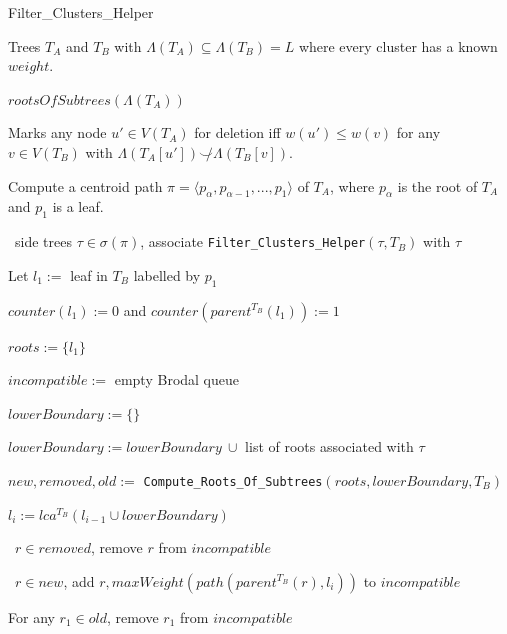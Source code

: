 \documentclass{article}
\newcommand{\compatible}{\smile}
\newcommand{\leafset}{\Lambda}
\begin{document}
    \begin{algorithm}
        \caption{Filter\_Clusters\_Helper}
        \label{alg:filterclustershelper}

        \begin{algorithmic}[1]
            \Input Trees $T_A$ and $T_B$ with $\leafset(T_A) \subseteq \leafset(T_B) = L$ where every cluster has a known $weight$.

            \Output $rootsOfSubtrees(\leafset(T_A))$

            \SideEffect Marks any node $u' \in V(T_A)$ for deletion iff $w(u') \leq w(v)$ for any $v \in V(T_B)$ with $\leafset(T_A[u']) \not\compatible \leafset(T_B[v])$.

            \State Compute a centroid path $\pi = \langle p_{\alpha}, p_{\alpha - 1}, ..., p_1 \rangle$ of $T_A$, where $p_{\alpha}$ is the root of $T_A$ and $p_1$ is a leaf.

            \State \algorithmicforall\ side trees $\tau \in \sigma(\pi)$,
                associate \texttt{Filter\_Clusters\_Helper}$(\tau, T_B)$ with $\tau$

            \State Let $l_1 :=$ leaf in $T_B$ labelled by $p_1$

            \State $counter(l_1) := 0$ and $counter(parent^{T_B}(l_1)) := 1$

            \State $roots := \{l_1\}$

            \State $incompatible :=$ empty Brodal queue

                \State $lowerBoundary := \{\}$

                    \State $lowerBoundary := lowerBoundary\ \cup$ list of roots associated with $\tau$
                \EndFor

                \State $new, removed, old :=$ \texttt{Compute\_Roots\_Of\_Subtrees}$(roots, lowerBoundary, T_B)$

                \State $l_i := lca^{T_B}(l_{i-1} \cup lowerBoundary)$

                \State \algorithmicforall\ $r \in removed$, remove $r$ from $incompatible$

                \State \algorithmicforall\ $r \in new$, add $r, maxWeight(path(parent^{T_B}(r), l_i))$ to $incompatible$

                    \State For any $r_1 \in old$, remove $r_1$ from $incompatible$


\end{algorithmic}
\end{algorithm}
\end{document}
